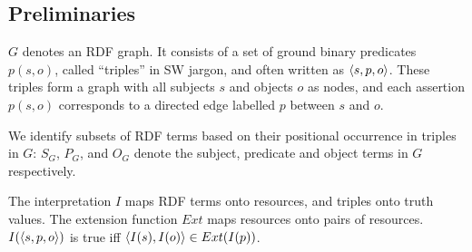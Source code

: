 \subsection{Preliminaries}
\label{sec:preliminaries}

$G$ denotes an RDF graph. It consists of a set of ground binary
predicates $p(s,o)$, called ``triples'' in SW jargon, and often
written as $\langle s,p,o\rangle$. These triples form a graph with all
subjects $s$ and objects $o$ as nodes, and
each assertion $p(s,o)$ corresponds to a directed edge labelled $p$
between $s$ and $o$.

We identify subsets of RDF terms based on
  their positional occurrence in triples in $G$:
  $S_G$, $P_G$, and $O_G$ denote the subject, predicate and object terms
  in $G$ respectively.

The interpretation $I$ maps RDF terms onto resources,
  and triples onto truth values.
The extension function $Ext$ maps resources onto pairs of resources.
$I(\langle s,p,o\rangle)$ is true iff
  $\langle I(s),I(o)\rangle \in Ext(I(p))$.

